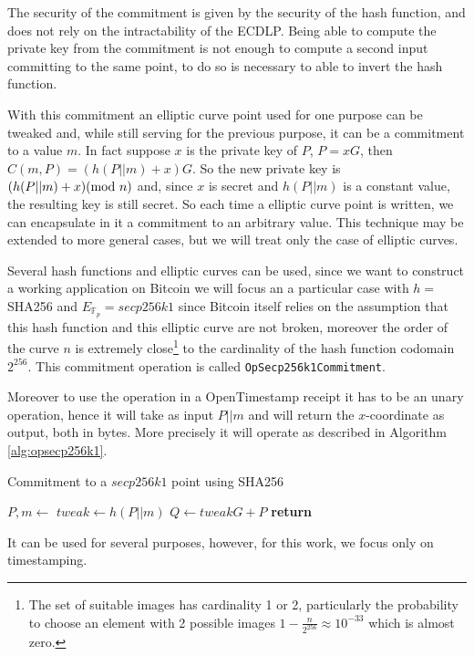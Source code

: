 The security of the commitment is given by the security of the hash function, and does not rely on the intractability of the ECDLP. Being able to compute the private key from the commitment is not enough to compute a second input committing to the same point, to do so is necessary to able to invert the hash function.

With this commitment an elliptic curve point used for one purpose can be tweaked and, while still serving for the previous purpose, it can be a commitment to a value $m$. In fact suppose $x$ is the private key of $P$, $P=xG$, then $C(m,P)=(h(P||m)+x)G$. So the new private key is $(h(P||m)+x) (\textmd{mod } n)$ and, since $x$ is secret and $h(P||m)$ is a constant value, the resulting key is still secret.
So each time a elliptic curve point is written, we can encapsulate in it a commitment to an arbitrary value.
This technique may be extended to more general cases, but we will treat only the case of elliptic curves.

Several hash functions and elliptic curves can be used, since we want to construct a working application on Bitcoin we will focus an a particular case with $h=$ SHA256 and $E_{\mathbb{F}_p}=secp256k1$ since Bitcoin itself relies on the assumption that this hash function and this elliptic curve are not broken, moreover the order of the curve $n$ is extremely close\footnote{The set of suitable images has cardinality 1 or 2, particularly the probability to choose an element with 2 possible images $1-\frac{n}{2^{256}}\approx10^{-33}$ which is almost zero.} 
to the cardinality of the hash function codomain $2^{256}$. This commitment operation is called \verb|OpSecp256k1Commitment|.

Moreover to use the operation in a OpenTimestamp receipt it has to be an unary operation, hence it will take as input $P||m$ and will return the $x$-coordinate as output, both in bytes. More precisely it will operate as described in Algorithm \ref{alg:opsecp256k1}.
\begin{algorithm}
	\caption{Commitment to a $secp256k1$ point using SHA256}
	\label{alg:opsecp256k1}
	\begin{algorithmic}[1]
	\State $P,m \gets$ 
	\State $tweak \gets h(P||m)$
	\State $Q \gets tweak G + P$
	\State \textbf{return} 
	\EndProcedure
	\end{algorithmic}
\end{algorithm}
It can be used for several purposes, however, for this work, we focus only on timestamping.

